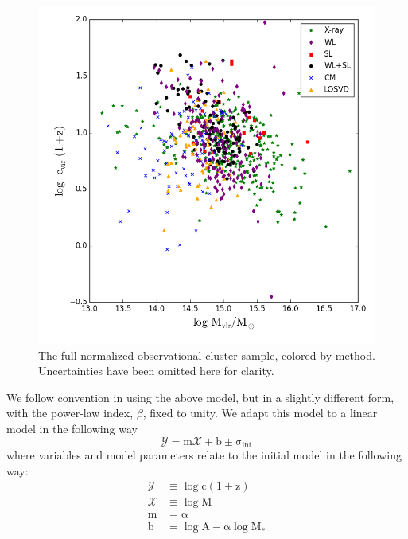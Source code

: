 \begin{figure}
\begin{center}
\includegraphics[width=\textwidth]{./images/CMRelationProject/CMRelation_FullSample_Symmetrized.png}
\end{center}
\caption[The Normalized Data]{The full normalized observational cluster sample, colored by
  method. Uncertainties have been omitted here for clarity.}
\end{figure}


We follow convention in using the above model, but in a slightly different
form, with the power-law index, $\beta$, fixed to unity. We adapt this model to
a linear model in the following way
\begin{equation}
\mathrm{\mathcal{Y} = m\mathcal{X}+b \pm \sigma_{int}}
\end{equation}
where variables and model parameters relate to the initial model in the
following way:
\begin{subequations}
\begin{align}
\mathrm{\mathcal{Y}}&\mathrm{\equiv \log c (1+z)}\\
\mathrm{\mathcal{X}}&\mathrm{\equiv \log M}\\
\mathrm{m}&\mathrm{= \alpha}\\
\mathrm{b}&\mathrm{= \log A - \alpha \log M_{*}}
\end{align}
\end{subequations}

